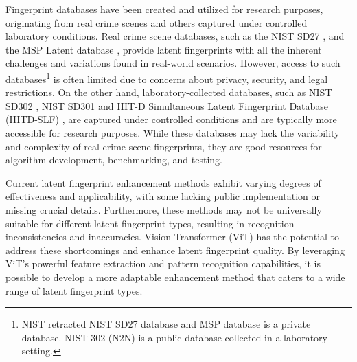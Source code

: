 \documentclass[twocolumn, switch]{article} %
\begin{document}
Fingerprint databases have been created and utilized for research purposes, originating from real crime scenes and others captured under controlled laboratory conditions. Real crime scene databases, such as the NIST SD27 \cite{garris2000nist}, and the MSP Latent database \cite{yoon2015longitudinal}, provide latent fingerprints with all the inherent challenges and variations found in real-world scenarios. However, access to such databases\footnote{NIST retracted NIST SD27 database and MSP database is a private database. NIST 302 (N2N) is a public database collected in a laboratory setting.} is often limited due to concerns about privacy, security, and legal restrictions. On the other hand, laboratory-collected databases, such as NIST SD302 \cite{fiumara2019nist}, NIST SD301 \cite{fiumara2018nist_301} and IIIT-D Simultaneous Latent Fingerprint Database (IIITD-SLF) \cite{yusof2012multi}, are captured under controlled conditions and are typically more accessible for research purposes. While these databases may lack the variability and complexity of real crime scene fingerprints, they are good resources for algorithm development, benchmarking, and testing. %


Current latent fingerprint enhancement methods \cite{yoon2010latent,liban2018latent, huang2020latent} exhibit varying degrees of effectiveness and applicability, with some lacking public implementation or missing crucial details. Furthermore, these methods may not be universally suitable for different latent fingerprint types, resulting in recognition inconsistencies and inaccuracies. Vision Transformer (ViT) \cite{DBLP:journals/corr/abs-2010-11929} has the potential to address these shortcomings and enhance latent fingerprint quality. By leveraging ViT's powerful feature extraction and pattern recognition capabilities, it is possible to develop a more adaptable enhancement method that caters to a wide range of latent fingerprint types. 
\end{document}
